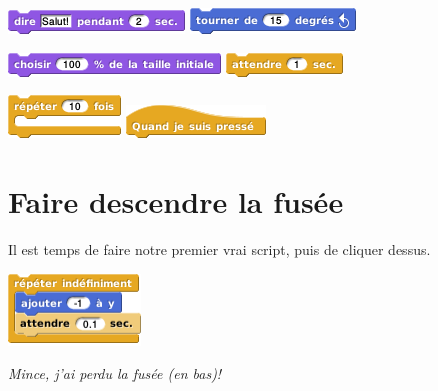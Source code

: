 \documentclass[a7paper,pagesize,DIV=14,10pt]{scrbook}
\begin{document}
\vspace{-.2\baselineskip}
\includegraphics[scale=.45]{img/snap-hello.png}\hfill
\includegraphics[scale=.45]{img/snap-tourne.png}

\vspace{-.2\baselineskip}
\includegraphics[scale=.45]{img/snap-size.png}\hfill
\includegraphics[scale=.45]{img/snap-sleep.png}

\vspace{-.2\baselineskip}
\includegraphics[scale=.45]{img/snap-repete.png}\hfill
\includegraphics[scale=.45]{img/snap-click.png}

\vspace{-.7\baselineskip}
\section*{Faire descendre la fusée}
\vspace{-.7\baselineskip}

\begin{minipage}{.6\linewidth}
  Il est temps de faire notre premier vrai script, puis de cliquer dessus.
\end{minipage}\hfill
\begin{minipage}{.35\linewidth}
  \includegraphics[scale=.5]{img/fusee_vitesse-cste.png}
\end{minipage}

\medskip
\centerline{\it Mince, j'ai perdu la fusée (en bas)!}
\end{document}
